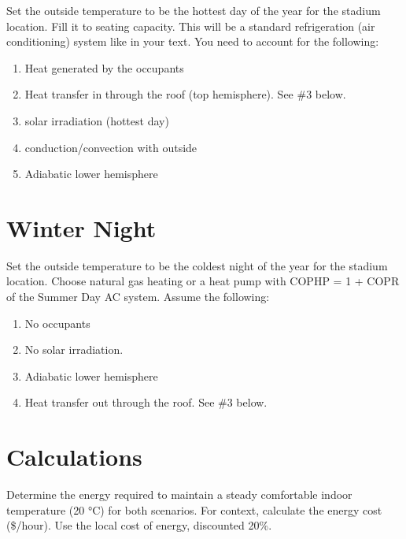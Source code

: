 \documentclass[
]{book}
\providecommand{\tightlist}{%
  \setlength{\itemsep}{0pt}\setlength{\parskip}{0pt}}
\begin{document}
Set the outside temperature to be the hottest day of the year for the stadium location. Fill it to seating capacity. This will be a standard refrigeration (air conditioning) system like in your text. You need to account for the following:

\begin{enumerate}
\def\labelenumi{\arabic{enumi}.}
\tightlist
\item
  Heat generated by the occupants\\
\item
  Heat transfer in through the roof (top hemisphere). See \#3 below.\\
\item
  solar irradiation (hottest day)\\
\item
  conduction/convection with outside\\
\item
  Adiabatic lower hemisphere
\end{enumerate}

\hypertarget{winter-night}{%
\section{Winter Night}\label{winter-night}}

Set the outside temperature to be the coldest night of the year for the stadium location. Choose natural gas heating or a heat pump with COPHP = 1 + COPR of the Summer Day AC system. Assume the following:

\begin{enumerate}
\def\labelenumi{\arabic{enumi}.}
\tightlist
\item
  No occupants\\
\item
  No solar irradiation.\\
\item
  Adiabatic lower hemisphere\\
\item
  Heat transfer out through the roof. See \#3 below.
\end{enumerate}

\hypertarget{calculations}{%
\section{Calculations}\label{calculations}}

Determine the energy required to maintain a steady comfortable indoor temperature (20 °C) for both scenarios. For context, calculate the energy cost (\$/hour). Use the local cost of energy, discounted 20\%.
\end{document}

